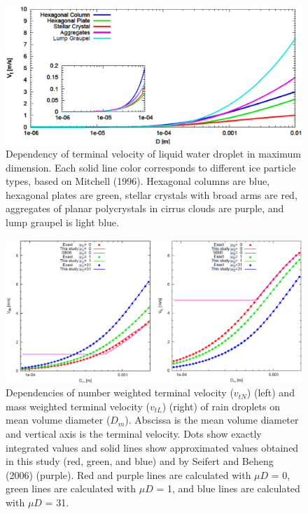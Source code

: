 \begin{figure}[htbp]
\begin{center}
\includegraphics[scale=0.3]{./figure/D_vt_sn14-ice.eps}
\end{center}
\caption{Dependency of terminal velocity of liquid water droplet in maximum dimension. Each solid line color corresponds to different ice particle types, based on Mitchell (1996). Hexagonal columns are blue, hexagonal plates are green, stellar crystals with broad arms are red, aggregates of planar polycrystals in cirrus clouds are purple, and lump graupel is light blue.}
\label{figsn2-12}
\end{figure}

\begin{figure}[htbp]
\begin{center}
\includegraphics[scale=0.4]{./figure/D_vt_sn14-1.eps}
\end{center}
\caption{Dependencies of number weighted terminal velocity ($v_{tN}$) (left) and mass weighted terminal velocity ($v_{tL}$) (right) of rain droplets on mean volume diameter ($D_{m}$). Abscissa is the mean volume diameter and vertical axis is the terminal velocity. Dots show exactly integrated values and solid lines show approximated values obtained in this study (red, green, and blue) and by Seifert and Beheng (2006) (purple). Red and purple lines are calculated with $\mu D$ = 0, green lines are calculated with $\mu D$ = 1, and blue lines are calculated with $\mu D$ = 31.}
\label{figsn2-13}
\end{figure}

